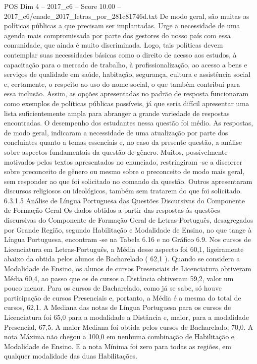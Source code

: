 \begin{textsample}{POS Dim 4 – 2017\_c6 – Score 10.00 – 2017\_c6/enade\_2017\_letras\_por\_281c81746d.txt}
De modo geral, são muitas as políticas públicas a que precisam ser implantadas.
Urge a necessidade de uma agenda mais compromissada por parte dos gestores do nosso país com essa comunidade, que ainda é muito discriminada.
Logo, tais políticas devem contemplar suas necessidades básicas como o direito de acesso aos estudos, à capacitação para o mercado de trabalho, à profissionalização, ao acesso a bens e serviços de qualidade em saúde, habitação, segurança, cultura e assistência social e, certamente, o respeito ao uso do nome social, o que também contribui para essa inclusão.
Assim, as opções apresentadas no padrão de resposta funcionaram como exemplos de políticas públicas possíveis, já que seria difícil apresentar uma lista suficientemente ampla para abranger a grande variedade de respostas encontradas.
O desempenho dos estudantes nessa questão foi médio.
As respostas, de modo geral, indicaram a necessidade de uma atualização por parte dos concluintes quanto a temas essenciais e, no caso da presente questão, a análise sobre aspectos fundamentais da questão de gênero.
Muitos, possivelmente motivados pelos textos apresentados no enunciado, restringiram -se a discorrer sobre preconceito de gênero ou mesmo sobre o preconceito de modo mais geral, sem responder ao que foi solicitado no comando da questão.
Outros apresentaram discursos religiosos ou ideológicos, também sem tratarem do que foi solicitado. 6.3.1.5 Análise de Língua Portuguesa das Questões Discursivas do Componente de Formação Geral Os dados obtidos a partir das respostas às questões discursivas do Componente de Formação Geral de Letras-Português, desagregados por Grande Região, segundo Habilitação e Modalidade de Ensino, no que tange à Língua Portuguesa, encontram -se na Tabela 6.16 e no Gráfico 6.9.
Nos cursos de Licenciatura em Letras-Português, a Média desse aspecto foi 60,1, ligeiramente abaixo da obtida pelos alunos de Bacharelado ( 62,1 ).
Quando se considera a Modalidade de Ensino, os alunos de cursos Presenciais de Licenciatura obtiveram Média 60,4, ao passo que os de cursos a Distância obtiveram 59,2, valor um pouco menor.
Para os cursos de Bacharelado, como já se sabe, só houve participação de cursos Presenciais e, portanto, a Média é a mesma do total de cursos, 62,1.
A Mediana das notas de Língua Portuguesa para os cursos de Licenciatura foi 65,0 para a modalidade a Distância e, maior, para a modalidade Presencial, 67,5.
A maior Mediana foi obtida pelos cursos de Bacharelado, 70,0.
A nota Máxima não chegou a 100,0 em nenhuma combinação de Habilitação e Modalidade de Ensino.
E a nota Mínima foi zero para todas as regiões, em qualquer modalidade das duas Habilitações.

\end{textsample}
